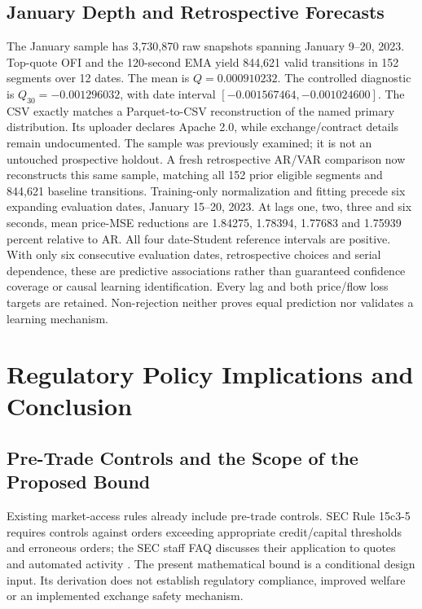 \documentclass[12pt]{article}
\theoremstyle{definition}
\theoremstyle{remark}
\begin{document}
\subsection{January Depth and Retrospective Forecasts}
The January sample has 3,730,870 raw snapshots spanning January 9--20, 2023. Top-quote OFI and the 120-second EMA yield 844,621 valid transitions in 152 segments over 12 dates. The mean is $Q=0.000910232$. The controlled diagnostic is $Q_{30}=-0.001296032$, with date interval $[-0.001567464,-0.001024600]$. The CSV exactly matches a Parquet-to-CSV reconstruction of the named primary distribution. Its uploader declares Apache 2.0, while exchange/contract details remain undocumented. The sample was previously examined; it is not an untouched prospective holdout. A fresh retrospective AR/VAR comparison now reconstructs this same sample, matching all 152 prior eligible segments and 844,621 baseline transitions. Training-only normalization and fitting precede six expanding evaluation dates, January 15--20, 2023. At lags one, two, three and six seconds, mean price-MSE reductions are 1.84275, 1.78394, 1.77683 and 1.75939 percent relative to AR. All four date-Student reference intervals are positive. With only six consecutive evaluation dates, retrospective choices and serial dependence, these are predictive associations rather than guaranteed confidence coverage or causal learning identification. Every lag and both price/flow loss targets are retained. Non-rejection neither proves equal prediction nor validates a learning mechanism.


\section{Regulatory Policy Implications and Conclusion}
\label{sec:policy_conclusion}

\subsection{Pre-Trade Controls and the Scope of the Proposed Bound}
Existing market-access rules already include pre-trade controls. SEC Rule 15c3-5 requires controls against orders exceeding appropriate credit/capital thresholds and erroneous orders; the SEC staff FAQ discusses their application to quotes and automated activity \citep{sec2010marketaccess,sec2017marketaccessfaq}. The present mathematical bound is a conditional design input. Its derivation does not establish regulatory compliance, improved welfare or an implemented exchange safety mechanism.
\end{document}
